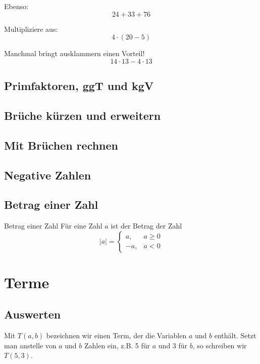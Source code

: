 \begin{example}
Ebenso:
\[
	24+33+76
\]
\end{example}

\begin{example}
Multipliziere aus:
\[
	4\cdot (20-5)
\]
\end{example}

\begin{example}
Manchmal bringt ausklammern einen Vorteil!
\[
	14\cdot 13 - 4\cdot 13
\]
\end{example}

\subsection{Primfaktoren, ggT und kgV}

\subsection{Brüche kürzen und erweitern}

\subsection{Mit Brüchen rechnen}

\subsection{Negative Zahlen}

\subsection{Betrag einer Zahl}

\begin{defn}{Betrag einer Zahl}
		Für eine Zahl $a$ ist der Betrag der Zahl
		\[
			|a|=\left\{\begin{array}{ll} a, & a\ge 0 \\
         -a, & a<0\end{array}\right.
		\]
\end{defn}


\section{Terme}
\subsection*{Auswerten}
Mit $T(a,b)$ bezeichnen wir einen Term, der die Variablen $a$ und $b$ enthält. Setzt man anstelle von $a$ und $b$ Zahlen ein, z.B. 5 für $a$ und 3 für $b$, so schreiben wir $T(5,3)$.
\vspace{1cm}

